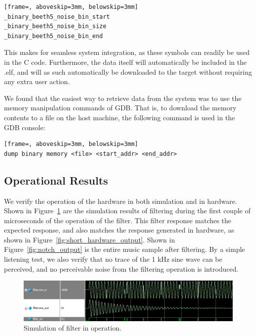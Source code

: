 \documentclass[]{article}
\begin{document}
\begin{lstlisting}[frame=, aboveskip=3mm, belowskip=3mm]
_binary_beeth5_noise_bin_start
_binary_beeth5_noise_bin_size
_binary_beeth5_noise_bin_end
\end{lstlisting}

This makes for seamless system integration, as these symbols can readily be used in the C code. Furthermore, the data itself will automatically be included in the .elf, and will as such automatically be downloaded to the target without requiring any extra user action.

We found that the easiest way to retrieve data from the system was to use the memory manipulation commands of GDB. That is, to download the memory contents to a file on the host machine, the following command is used in the GDB console:

\begin{lstlisting}[frame=, aboveskip=3mm, belowskip=3mm]
dump binary memory <file> <start_addr> <end_addr>
\end{lstlisting}


\subsection{Operational Results} %
\label{sub:operational_results}

We verify the operation of the hardware in both simulation and in hardware.
Shown in Figure~\ref{fig:notch_sim} are the simulation results of filtering during the first couple of microseconds of the operation of the filter.
This filter response matches the expected response, and also matches the response generated in hardware, as shown in Figure~\ref{fig:short_hardware_output}.
Shown in Figure~\ref{fig:notch_output} is the entire music sample after filtering. By a simple listening test, we also verify that no trace of the 1 kHz sine wave can be perceived, and no perceivable noise from the filtering operation is introduced.


\begin{figure}[p]
	\begin{center}
		\includegraphics[width = \textwidth]{Notch_proper_data_cropped.png}
	\end{center}
	\caption{Simulation of filter in operation.}
	\label{fig:notch_sim}
\end{figure}
\end{document}
